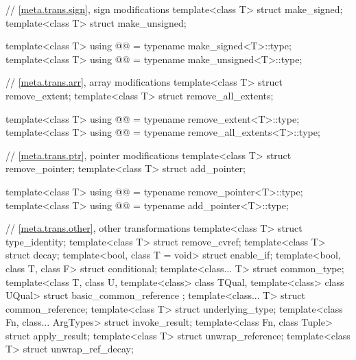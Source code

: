 \begin{codeblock}
{  // \ref{meta.trans.sign}, sign modifications
  template<class T> struct make_signed;
  template<class T> struct make_unsigned;

  template<class T>
    using @@   = typename make_signed<T>::type;
  template<class T>
    using @@ = typename make_unsigned<T>::type;

  // \ref{meta.trans.arr}, array modifications
  template<class T> struct remove_extent;
  template<class T> struct remove_all_extents;

  template<class T>
    using @@      = typename remove_extent<T>::type;
  template<class T>
    using @@ = typename remove_all_extents<T>::type;

  // \ref{meta.trans.ptr}, pointer modifications
  template<class T> struct remove_pointer;
  template<class T> struct add_pointer;

  template<class T>
    using @@ = typename remove_pointer<T>::type;
  template<class T>
    using @@    = typename add_pointer<T>::type;

  // \ref{meta.trans.other}, other transformations
  template<class T> struct type_identity;
  template<class T> struct remove_cvref;
  template<class T> struct decay;
  template<bool, class T = void> struct enable_if;
  template<bool, class T, class F> struct conditional;
  template<class... T> struct common_type;
  template<class T, class U, template<class> class TQual, template<class> class UQual>
    struct basic_common_reference { };
  template<class... T> struct common_reference;
  template<class T> struct underlying_type;
  template<class Fn, class... ArgTypes> struct invoke_result;
  template<class Fn, class Tuple> struct apply_result;
  template<class T> struct unwrap_reference;
  template<class T> struct unwrap_ref_decay;

}
\end{codeblock}
